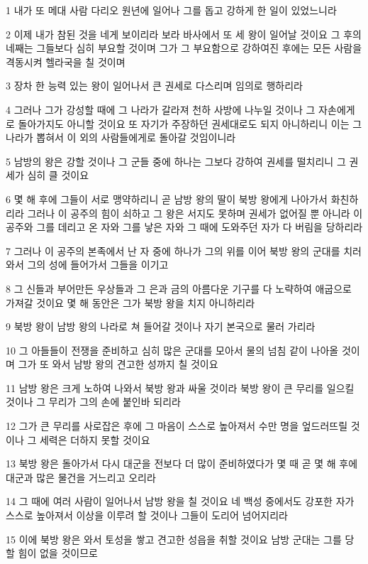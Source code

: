 \par 1 내가 또 메대 사람 다리오 원년에 일어나 그를 돕고 강하게 한 일이 있었느니라
\par 2 이제 내가 참된 것을 네게 보이리라 보라 바사에서 또 세 왕이 일어날 것이요 그 후의 네째는 그들보다 심히 부요할 것이며 그가 그 부요함으로 강하여진 후에는 모든 사람을 격동시켜 헬라국을 칠 것이며
\par 3 장차 한 능력 있는 왕이 일어나서 큰 권세로 다스리며 임의로 행하리라
\par 4 그러나 그가 강성할 때에 그 나라가 갈라져 천하 사방에 나누일 것이나 그 자손에게로 돌아가지도 아니할 것이요 또 자기가 주장하던 권세대로도 되지 아니하리니 이는 그 나라가 뽑혀서 이 외의 사람들에게로 돌아갈 것임이니라
\par 5 남방의 왕은 강할 것이나 그 군들 중에 하나는 그보다 강하여 권세를 떨치리니 그 권세가 심히 클 것이요
\par 6 몇 해 후에 그들이 서로 맹약하리니 곧 남방 왕의 딸이 북방 왕에게 나아가서 화친하리라 그러나 이 공주의 힘이 쇠하고 그 왕은 서지도 못하며 권세가 없어질 뿐 아니라 이 공주와 그를 데리고 온 자와 그를 낳은 자와 그 때에 도와주던 자가 다 버림을 당하리라
\par 7 그러나 이 공주의 본족에서 난 자 중에 하나가 그의 위를 이어 북방 왕의 군대를 치러 와서 그의 성에 들어가서 그들을 이기고
\par 8 그 신들과 부어만든 우상들과 그 은과 금의 아름다운 기구를 다 노략하여 애굽으로 가져갈 것이요 몇 해 동안은 그가 북방 왕을 치지 아니하리라
\par 9 북방 왕이 남방 왕의 나라로 쳐 들어갈 것이나 자기 본국으로 물러 가리라
\par 10 그 아들들이 전쟁을 준비하고 심히 많은 군대를 모아서 물의 넘침 같이 나아올 것이며 그가 또 와서 남방 왕의 견고한 성까지 칠 것이요
\par 11 남방 왕은 크게 노하여 나와서 북방 왕과 싸울 것이라 북방 왕이 큰 무리를 일으킬 것이나 그 무리가 그의 손에 붙인바 되리라
\par 12 그가 큰 무리를 사로잡은 후에 그 마음이 스스로 높아져서 수만 명을 엎드러뜨릴 것이나 그 세력은 더하지 못할 것이요
\par 13 북방 왕은 돌아가서 다시 대군을 전보다 더 많이 준비하였다가 몇 때 곧 몇 해 후에 대군과 많은 물건을 거느리고 오리라
\par 14 그 때에 여러 사람이 일어나서 남방 왕을 칠 것이요 네 백성 중에서도 강포한 자가 스스로 높아져서 이상을 이루려 할 것이나 그들이 도리어 넘어지리라
\par 15 이에 북방 왕은 와서 토성을 쌓고 견고한 성읍을 취할 것이요 남방 군대는 그를 당할 힘이 없을 것이므로

